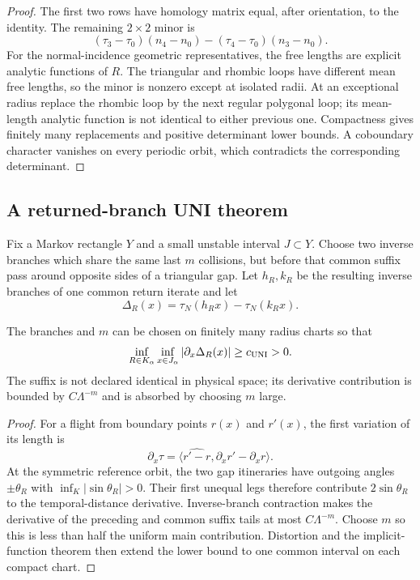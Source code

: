 \begin{proof}
The first two rows have homology matrix equal, after orientation, to the
identity.  The remaining $2\times2$ minor is
\[
 (\tau_3-\tau_0)(n_4-n_0)-(\tau_4-\tau_0)(n_3-n_0).
\]
For the normal-incidence geometric representatives, the free lengths are
explicit analytic functions of $R$.  The triangular and rhombic loops have
different mean free lengths, so the minor is nonzero except at isolated radii.
At an exceptional radius replace the rhombic loop by the next regular polygonal
loop; its mean-length analytic function is not identical to either previous
one.  Compactness gives finitely many replacements and positive determinant
lower bounds.  A coboundary character vanishes on every periodic orbit, which
contradicts the corresponding determinant.
\end{proof}

\subsection{A returned-branch UNI theorem}

Fix a Markov rectangle $Y$ and a small unstable interval $J\subset Y$.  Choose
two inverse branches which share the same last $m$ collisions, but before that
common suffix pass around opposite sides of a triangular gap.  Let $h_R,k_R$
be the resulting inverse branches of one common return iterate and let
\[
 \Delta_R(x)=\tau_N(h_Rx)-\tau_N(k_Rx).
\]

\begin{theorem}
\label{thm:r9-a2-uni}
The branches and $m$ can be chosen on finitely many radius charts so that
\[
 \inf_{R\in K_\alpha}\inf_{x\in J_\alpha}
 |\partial_x\Delta_R(x)|\ge c_{\rm UNI}>0.
\]
The suffix is not declared identical in physical space; its derivative
contribution is bounded by $C\Lambda^{-m}$ and is absorbed by choosing $m$
large.
\end{theorem}

\begin{proof}
For a flight from boundary points $r(x)$ and $r'(x)$, the first variation of
its length is
\[
 \partial_x\tau=\bigl\langle\widehat{r'-r},
 \partial_xr'-\partial_xr\bigr\rangle.
\]
At the symmetric reference orbit, the two gap itineraries have outgoing angles
$\pm\theta_R$ with $\inf_K|\sin\theta_R|>0$.  Their first unequal legs
therefore contribute $2\sin\theta_R$ to the temporal-distance derivative.
Inverse-branch contraction makes the derivative of the preceding and common
suffix tails at most $C\Lambda^{-m}$.  Choose $m$ so this is less than half the
uniform main contribution.  Distortion and the implicit-function theorem then
extend the lower bound to one common interval on each compact chart.
\end{proof}

